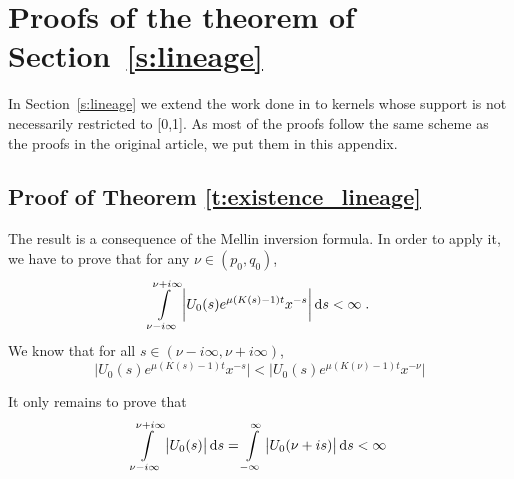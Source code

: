 \section{Proofs of the theorem of Section~\ref{s:lineage}}
In Section~\ref{s:lineage} we extend the work done in \cite{doumic2016time} to kernels whose support is not necessarily restricted to [0,1]. As most of the proofs follow the same scheme as the proofs in the original article, we put them in this appendix. 

\subsection{Proof of Theorem \ref{t:existence_lineage}}
\label{proof:existence_lineage}
The result is a consequence of the Mellin inversion formula.
In order to apply it, we have to prove that for any $\nu \in (p_0, q_0)$, 
    \begin{equation*}
        \int\limits_{\nu - i \infty}^{\nu + i \infty} \bigg| U_0(s) e^{\mu(K(s) - 1) t} x^{-s} \bigg| \, \mathrm ds < \infty
        \; .
    \end{equation*}
We know that for all $s \in (\nu - i\infty, \nu + i\infty)$, 
    \begin{equation*}
         \bigg| U_0(s) e^{\mu(K(s) - 1) t} x^{-s} \bigg|  <   \bigg| U_0(s)  e^{\mu(K(\nu) - 1) t}  x^{-\nu} \bigg|
    \end{equation*}

It only remains to prove that 
    \begin{equation}
            \int\limits_{\nu - i \infty}^{\nu + i \infty} \big| U_0(s)\big| \, \mathrm ds 
            = 
            \int\limits_{-\infty}^{\infty} \big| U_0(\nu + is)\big| \, \mathrm ds
            < \infty
            \label{eq:DouEsc43}
    \end{equation}

